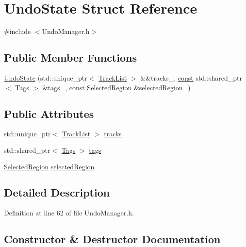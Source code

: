 \hypertarget{struct_undo_state}{}\section{Undo\+State Struct Reference}
\label{struct_undo_state}


{\ttfamily \#include $<$Undo\+Manager.\+h$>$}

\subsection*{Public Member Functions}
\begin{DoxyCompactItemize}
\item 
\hyperlink{struct_undo_state_a4ba6f91eaddbe3083990fd6ed9aa24af}{Undo\+State} (std\+::unique\+\_\+ptr$<$ \hyperlink{class_track_list}{Track\+List} $>$ \&\&tracks\+\_\+, \hyperlink{getopt1_8c_a2c212835823e3c54a8ab6d95c652660e}{const} std\+::shared\+\_\+ptr$<$ \hyperlink{class_tags}{Tags} $>$ \&tags\+\_\+, \hyperlink{getopt1_8c_a2c212835823e3c54a8ab6d95c652660e}{const} \hyperlink{class_selected_region}{Selected\+Region} \&selected\+Region\+\_\+)
\end{DoxyCompactItemize}
\subsection*{Public Attributes}
\begin{DoxyCompactItemize}
\item 
std\+::unique\+\_\+ptr$<$ \hyperlink{class_track_list}{Track\+List} $>$ \hyperlink{struct_undo_state_a72dceb89d0c5fe495d97f5aad787cb7c}{tracks}
\item 
std\+::shared\+\_\+ptr$<$ \hyperlink{class_tags}{Tags} $>$ \hyperlink{struct_undo_state_acc561c7190e6371f8deb46fd04812e1f}{tags}
\item 
\hyperlink{class_selected_region}{Selected\+Region} \hyperlink{struct_undo_state_afdbfd23d553f63997398dcac7afe6c2f}{selected\+Region}
\end{DoxyCompactItemize}


\subsection{Detailed Description}


Definition at line 62 of file Undo\+Manager.\+h.



\subsection{Constructor \& Destructor Documentation}
